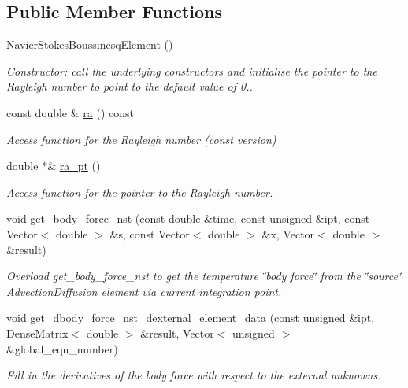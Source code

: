 \subsection*{Public Member Functions}
\begin{DoxyCompactItemize}
\item 
\hyperlink{classoomph_1_1NavierStokesBoussinesqElement_ad0ebb74a3963c0715e6e3e34ba8b1d7f}{Navier\+Stokes\+Boussinesq\+Element} ()
\begin{DoxyCompactList}\small\item\em Constructor\+: call the underlying constructors and initialise the pointer to the Rayleigh number to point to the default value of 0.. \end{DoxyCompactList}\item 
const double \& \hyperlink{classoomph_1_1NavierStokesBoussinesqElement_a3318acc1306c60bd13b3bfe8e15a2fa5}{ra} () const
\begin{DoxyCompactList}\small\item\em Access function for the Rayleigh number (const version) \end{DoxyCompactList}\item 
double $\ast$\& \hyperlink{classoomph_1_1NavierStokesBoussinesqElement_ac822ef74e7bc0e55c917e58f2cd5a6fe}{ra\+\_\+pt} ()
\begin{DoxyCompactList}\small\item\em Access function for the pointer to the Rayleigh number. \end{DoxyCompactList}\item 
void \hyperlink{classoomph_1_1NavierStokesBoussinesqElement_a2ff5be3155df975541a25444d43c1ca8}{get\+\_\+body\+\_\+force\+\_\+nst} (const double \&time, const unsigned \&ipt, const Vector$<$ double $>$ \&s, const Vector$<$ double $>$ \&x, Vector$<$ double $>$ \&result)
\begin{DoxyCompactList}\small\item\em Overload get\+\_\+body\+\_\+force\+\_\+nst to get the temperature \char`\"{}body force\char`\"{} from the \char`\"{}source\char`\"{} Advection\+Diffusion element via current integration point. \end{DoxyCompactList}\item 
void \hyperlink{classoomph_1_1NavierStokesBoussinesqElement_a8a84c39e2156ab16b7aefc400891ac27}{get\+\_\+dbody\+\_\+force\+\_\+nst\+\_\+dexternal\+\_\+element\+\_\+data} (const unsigned \&ipt, Dense\+Matrix$<$ double $>$ \&result, Vector$<$ unsigned $>$ \&global\+\_\+eqn\+\_\+number)
\begin{DoxyCompactList}\small\item\em Fill in the derivatives of the body force with respect to the external unknowns. \end{DoxyCompactList}\item 

\end{DoxyCompactItemize}
